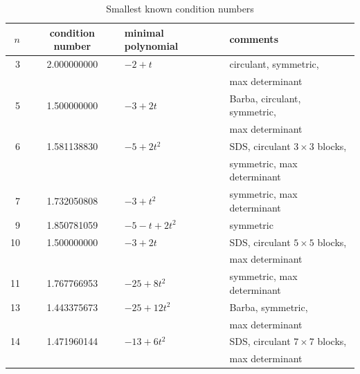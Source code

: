 \documentclass[11pt]{article}
\theoremstyle{plain}
\theoremstyle{definition}
\begin{document}
\begin{table}
\centering
\caption{Smallest known condition numbers}
\label{table}
\bigskip

\setlength{\aboverulesep}{0pt}
\setlength{\belowrulesep}{0pt}

\setlength{\extrarowheight}{3pt}

\begin{tabular}{r c l l}
\toprule
\rowcolor{toprow}
$n$ & condition number & minimal polynomial & comments \\[3pt]
\midrule

3  & 2.000000000 & $-2+t$ & 
circulant, symmetric, \\[-3pt]
   &             &         & max determinant \\[3pt]
\midrule

5  & 1.500000000 & $-3+2t$ & Barba, circulant, symmetric, \\[-3pt]
   &             &         & max determinant \\[3pt]
\midrule

\rowcolor{evenrow}
6  & 1.581138830 & $-5+2t^{2}$ & SDS, circulant $3\times 3$ blocks, \\
\rowcolor{evenrow}
   &             &              & symmetric, max determinant \\[3pt]
\midrule

7  & 1.732050808 & $-3+t^{2}$ & symmetric, max determinant \\[3pt]
\midrule

9  & 1.850781059 & $-5 - t + 2t^{2}$ & symmetric \\[3pt]
\midrule

\rowcolor{evenrow}
10 & 1.500000000 & $-3+2t$ & SDS, circulant $5\times5$ blocks, \\[-3pt]
\rowcolor{evenrow}
   &             &         & max determinant \\[3pt]
\midrule

11 & 1.767766953 & $-25+8t^{2}$ & symmetric, max determinant \\[3pt]
\midrule

13 & 1.443375673 & $-25+12t^{2}$ & Barba, symmetric, \\[-3pt]
   &             &               & max determinant \\[3pt]
\midrule

\rowcolor{evenrow}
14 & 1.471960144 & $-13+6t^{2}$ & SDS, circulant $7\times7$ blocks, \\[-3pt]
\rowcolor{evenrow}
   &             &              & max determinant \\[3pt]
\midrule


\end{tabular}
\end{table}
\end{document}
